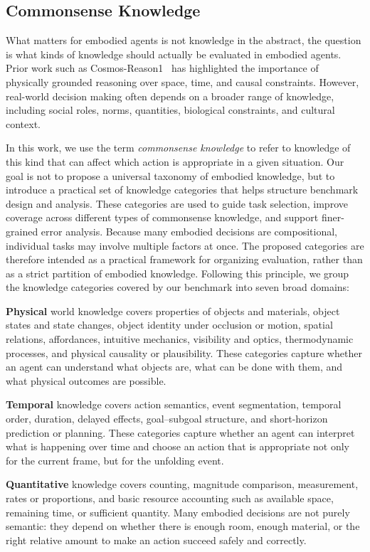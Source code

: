 \documentclass{llmxive}
\begin{document}
\subsection{Commonsense Knowledge}

What matters for embodied agents is not knowledge in the abstract, the question is what kinds of knowledge should actually be evaluated in embodied agents. Prior work such as Cosmos-Reason1~\citep{azzolini2025cosmos} has highlighted the importance of physically grounded reasoning over space, time, and causal constraints. However, real-world decision making often depends on a broader range of knowledge, including social roles, norms, quantities, biological constraints, and cultural context. 

In this work, we use the term \emph{commonsense knowledge} to refer to knowledge of this kind that can affect which action is appropriate in a given situation. Our goal is not to propose a universal taxonomy of embodied knowledge, but to introduce a practical set of knowledge categories that helps structure benchmark design and analysis. These categories are used to guide task selection, improve coverage across different types of commonsense knowledge, and support finer-grained error analysis. Because many embodied decisions are compositional, individual tasks may involve multiple factors at once. The proposed categories are therefore intended as a practical framework for organizing evaluation, rather than as a strict partition of embodied knowledge. Following this principle, we group the knowledge categories covered by our benchmark into seven broad domains:

\textbf{Physical} world knowledge covers properties of objects and materials, object states and state changes, object identity under occlusion or motion, spatial relations, affordances, intuitive mechanics, visibility and optics, thermodynamic processes, and physical causality or plausibility. These categories capture whether an agent can understand what objects are, what can be done with them, and what physical outcomes are possible. 
 
\textbf{Temporal} knowledge covers action semantics, event segmentation, temporal order, duration, delayed effects, goal–subgoal structure, and short-horizon prediction or planning. These categories capture whether an agent can interpret what is happening over time and choose an action that is appropriate not only for the current frame, but for the unfolding event. 

\textbf{Quantitative} knowledge covers counting, magnitude comparison, measurement, rates or proportions, and basic resource accounting such as available space, remaining time, or sufficient quantity. Many embodied decisions are not purely semantic: they depend on whether there is enough room, enough material, or the right relative amount to make an action succeed safely and correctly.
\end{document}
